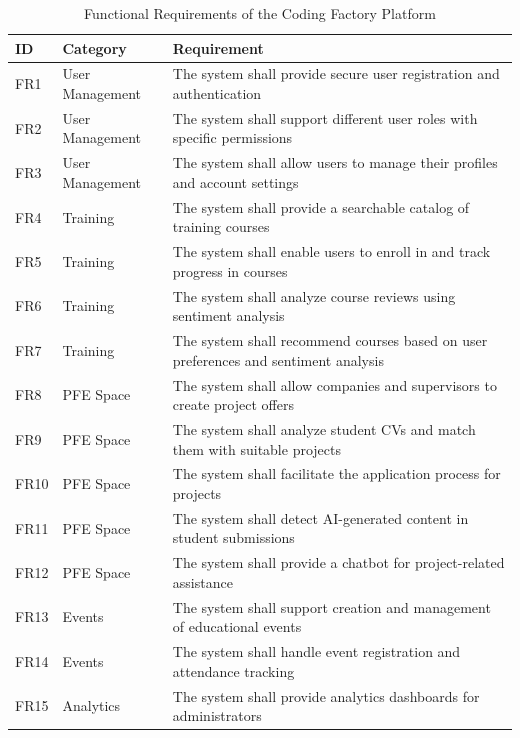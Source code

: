 \documentclass[12pt,a4paper]{report}
\begin{document}
\begin{table}[H]
\small
\centering
\begin{tabular}{|p{1cm}|p{2.8cm}|p{7.8cm}|}
\hline
\textbf{ID} & \textbf{Category} & \textbf{Requirement} \\
\hline
FR1 & User Management & The system shall provide secure user registration and authentication \\
\hline
FR2 & User Management & The system shall support different user roles with specific permissions \\
\hline
FR3 & User Management & The system shall allow users to manage their profiles and account settings \\
\hline
FR4 & Training & The system shall provide a searchable catalog of training courses \\
\hline
FR5 & Training & The system shall enable users to enroll in and track progress in courses \\
\hline
FR6 & Training & The system shall analyze course reviews using sentiment analysis \\
\hline
FR7 & Training & The system shall recommend courses based on user preferences and sentiment analysis \\
\hline
FR8 & PFE Space & The system shall allow companies and supervisors to create project offers \\
\hline
FR9 & PFE Space & The system shall analyze student CVs and match them with suitable projects \\
\hline
FR10 & PFE Space & The system shall facilitate the application process for projects \\
\hline
FR11 & PFE Space & The system shall detect AI-generated content in student submissions \\
\hline
FR12 & PFE Space & The system shall provide a chatbot for project-related assistance \\
\hline
FR13 & Events & The system shall support creation and management of educational events \\
\hline
FR14 & Events & The system shall handle event registration and attendance tracking \\
\hline
FR15 & Analytics & The system shall provide analytics dashboards for administrators \\
\hline
\end{tabular}
\caption{Functional Requirements of the Coding Factory Platform}
\label{tab:functional-requirements}
\end{table}
\end{document}
